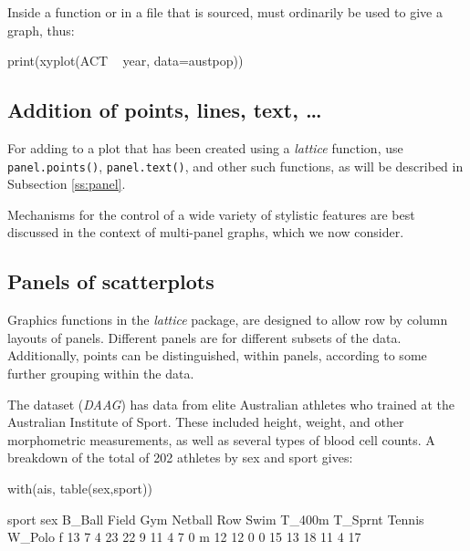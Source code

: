 Inside a function
or in a file that is sourced,  must
ordinarily be used to give a graph, thus:
\begin{Schunk}
\begin{Sinput}
print(xyplot(ACT ~ year, data=austpop))
\end{Sinput}
\end{Schunk}

\subsection*{Addition of points, lines, text, \ldots}
For adding
to a plot that has been created using a \textit{lattice} function,
use \verb!panel.points()!, \verb!panel.text()!, and other such
functions, as will be described in Subsection \ref{ss:panel}.

Mechanisms for the control of a wide variety of stylistic
features are best discussed in the context of multi-panel
graphs, which we now consider.

\subsection{Panels of scatterplots}

Graphics functions in the \textit{lattice} package, are designed to
allow row by column layouts of panels.  Different panels are for
different subsets of the data.  Additionally, points can be
distinguished, within panels, according to some further grouping
within the data.

The  dataset (\textit{DAAG}) has data
from elite Australian athletes who trained at the Australian
Institute of Sport. These included height, weight, and other
morphometric measurements, as well as several types of blood
cell counts.  A breakdown of the total of 202 athletes by sex
and sport gives:
\begin{fullwidth}
\begin{Schunk}
\begin{Sinput}
with(ais, table(sex,sport))
\end{Sinput}
\begin{Soutput}
   sport
sex B_Ball Field Gym Netball Row Swim T_400m T_Sprnt Tennis W_Polo
  f     13     7   4      23  22    9     11       4      7      0
  m     12    12   0       0  15   13     18      11      4     17
\end{Soutput}
\end{Schunk}
\end{fullwidth}
\noindent

